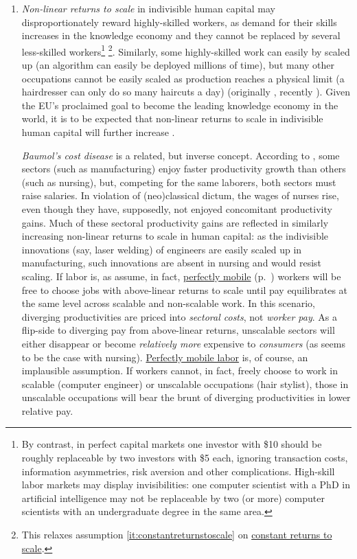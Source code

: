 \begin{enumerate}
	\item {} \label{it:non-linearreturns} \emph{Non-linear returns to scale} in indivisible human capital may disproportionately reward highly-skilled workers, as demand for their skills increases in the knowledge economy and they cannot be replaced by several less-skilled workers\footnote{
		By contrast, in perfect capital markets one investor with \$10 should be roughly replaceable by two investors with \$5 each, ignoring transaction costs, information asymmetries, risk aversion and other complications. High-skill labor markets may display invisibilities:  one computer scientist with a PhD in artificial intelligence may not be replaceable by two (or more) computer scientists with an undergraduate degree in the same area.} \footnote{
		This relaxes  assumption \ref{it:constantreturnstoscale} on \hyperref[it:constantreturnstoscale]{constant returns to scale}.}.
	Similarly, some highly-skilled work can easily by scaled up (an algorithm can  easily be deployed millions of time), but many other occupations cannot be easily scaled as production reaches a physical limit (a hairdresser can only do so many haircuts a day) (originally \citealt{Rosen1981}, recently \citealt{Taleb2007}). Given the \gls{EU}'s proclaimed goal to become the leading knowledge economy in the world, it is to be expected that non-linear returns to scale in indivisible human capital will further increase \citep{Commission2007}.
	
	\emph{Baumol's cost disease} is a related, but inverse concept. According to \cite{Baumol1965}, some sectors (such as  manufacturing) enjoy faster productivity growth than others (such as nursing), but, competing for the same laborers, both sectors must raise salaries. In violation of (neo)classical dictum, the wages of nurses rise, even though they have, supposedly, not enjoyed concomitant productivity gains. Much of these sectoral productivity gains are reflected in similarly increasing non-linear returns to scale in human capital: as the indivisible innovations (say, laser welding) of engineers are easily scaled up in manufacturing, such innovations are absent in nursing and would resist scaling. If labor is, as \cite{Baumol1965} assume, in fact, \hyperref[it:perfectfactormobility]{perfectly mobile} (p.~\pageref{sec:perfect-competition}) workers will be free to choose jobs with above-linear returns to scale until pay equilibrates at the same level across scalable and non-scalable work. In this scenario, diverging productivities are priced into \emph{sectoral costs}, not \emph{worker pay}. As a flip-side to diverging pay from above-linear returns, unscalable sectors will either disappear or become \emph{relatively more} expensive to \emph{consumers} (as seems to be the case with nursing). \hyperref[it:perfectfactormobility]{Perfectly mobile labor} is, of course, an implausible assumption. If workers cannot, in fact, freely choose to work in scalable (computer engineer) or unscalable occupations (hair stylist), those in unscalable occupations will bear the brunt of diverging productivities in lower relative pay. 
	

\end{enumerate}
